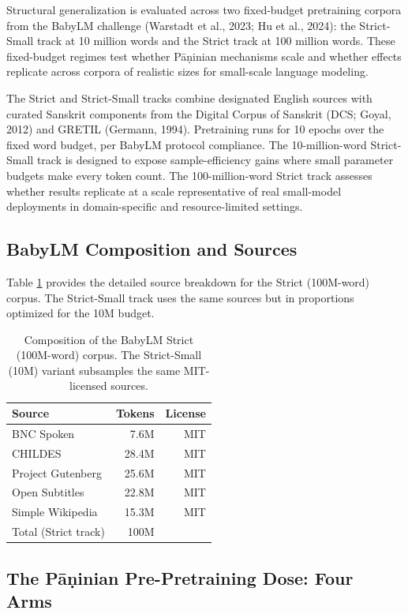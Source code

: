 Structural generalization is evaluated across two fixed-budget pretraining corpora from the BabyLM challenge (Warstadt et al., 2023; Hu et al., 2024): the Strict-Small track at 10 million words and the Strict track at 100 million words. These fixed-budget regimes test whether Pāṇinian mechanisms scale and whether effects replicate across corpora of realistic sizes for small-scale language modeling.

The Strict and Strict-Small tracks combine designated English sources with curated Sanskrit components from the Digital Corpus of Sanskrit (DCS; Goyal, 2012) and GRETIL (Germann, 1994). Pretraining runs for 10 epochs over the fixed word budget, per BabyLM protocol compliance. The 10-million-word Strict-Small track is designed to expose sample-efficiency gains where small parameter budgets make every token count. The 100-million-word Strict track assesses whether results replicate at a scale representative of real small-model deployments in domain-specific and resource-limited settings.

\subsection{BabyLM Composition and Sources}

Table \ref{tab:babylm_composition} provides the detailed source breakdown for the Strict (100M-word) corpus. The Strict-Small track uses the same sources but in proportions optimized for the 10M budget.

\begin{table}[h]
\centering
\small
\begin{tabular}{lrr}
\toprule
Source & Tokens & License \\
\midrule
BNC Spoken & 7.6M & MIT \\
CHILDES & 28.4M & MIT \\
Project Gutenberg & 25.6M & MIT \\
Open Subtitles & 22.8M & MIT \\
Simple Wikipedia & 15.3M & MIT \\
\midrule
Total (Strict track) & 100M & \\
\bottomrule
\end{tabular}
\caption{Composition of the BabyLM Strict (100M-word) corpus. The Strict-Small (10M) variant subsamples the same MIT-licensed sources.}
\label{tab:babylm_composition}
\end{table}

\subsection{The Pāṇinian Pre-Pretraining Dose: Four Arms}

